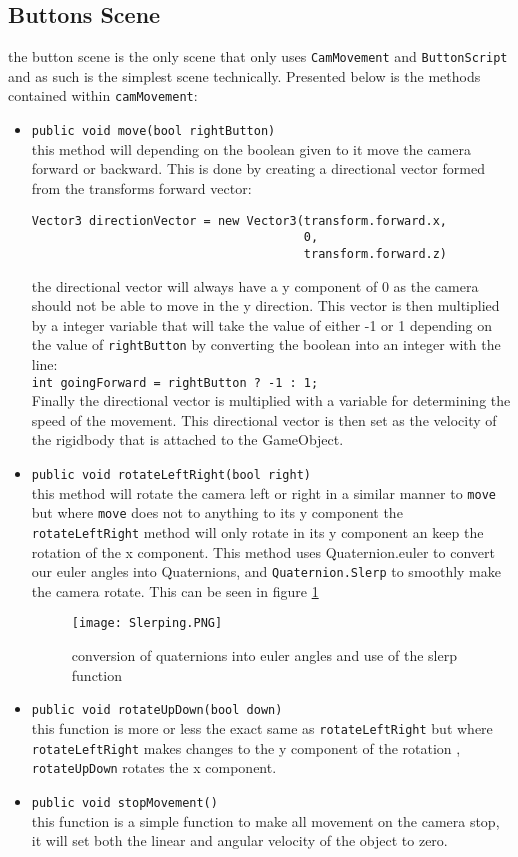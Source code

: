 \subsection{Buttons Scene}
the button scene is the only scene that only uses  {\tt CamMovement} and {\tt ButtonScript} and as such is the simplest scene technically. Presented below is  the methods contained within {\tt camMovement}: 
\begin{itemize}
\item {\tt public void move(bool rightButton)}\\
this method will depending on the boolean given to it move the camera forward or backward. This is done by creating a directional vector formed from the transforms forward vector:
\begin{verbatim}
Vector3 directionVector = new Vector3(transform.forward.x, 
                                      0,
                                      transform.forward.z)
\end{verbatim}
the directional vector will always have a y component of 0 as the camera should not be able to move in the y direction. This vector is then multiplied by a integer variable that will take the value of either -1 or 1 depending on the value of {\tt rightButton} by converting the boolean into an integer with the line:\\
{\tt int goingForward = rightButton ? -1 : 1;}\\
Finally the directional vector is multiplied with a variable for determining the speed of the movement. This directional vector is then set as the velocity of the rigidbody that is attached to the GameObject. 

\item {\tt public void rotateLeftRight(bool right)}\\
this method will rotate the camera left or right in a similar manner to {\tt move} but where {\tt move} does not to anything to its y component the {\tt rotateLeftRight} method will only rotate in its y component an keep the rotation of the x component. This method uses {Quaternion.euler } to convert our euler angles into Quaternions, and {\tt Quaternion.Slerp} to smoothly make the camera rotate. This can be seen in figure \ref{Slerping} 
\begin{figure}[H]
\centering
\texttt{[image: Slerping.PNG]}
\caption{conversion of quaternions into euler angles and use of the slerp function}
\label{Slerping}
\end{figure}
\item {\tt public void rotateUpDown(bool down)}\\
this function is more or less the exact same as {\tt rotateLeftRight} but where {\tt rotateLeftRight} makes changes to the y component of the rotation , {\tt rotateUpDown} rotates the x component. 

\item {\tt public void stopMovement()}\\
this function is a simple function to make all movement on the camera stop, it will set both the linear and angular velocity of the object to zero.
\end{itemize}


